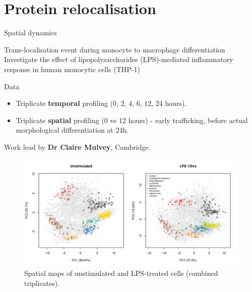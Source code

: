 \section{Protein relocalisation}


\begin{frame}{Spatial dynamics}
  \begin{block}{Trans-localisation event during monocyte to macrophage
      differentiation}
    Investigate the effect of lipopolysaccharides (LPS)-mediated
    inflammatory response in human monocytic cells (THP-1)
  \end{block}

  \begin{block}{Data}
    \begin{itemize}
    \item Triplicate \textbf{temporal} profiling (0, 2, 4, 6, 12, 24
      hours).
    \item Triplicate \textbf{spatial} profiling (0 vs 12 hours) -
      early trafficking, before actual morphological differentiation
      at 24h.
    \end{itemize}
  \end{block}

  Work lead by \textbf{Dr Claire Mulvey}, Cambridge.

\end{frame}



\begin{frame}
  \begin{figure}[h]
    \centering
    \includegraphics[width=\linewidth]{./figs/lps.pdf}
    \caption{Spatial maps of unstimulated and LPS-treated cells
      (combined triplicates).}
  \end{figure}
\end{frame}


